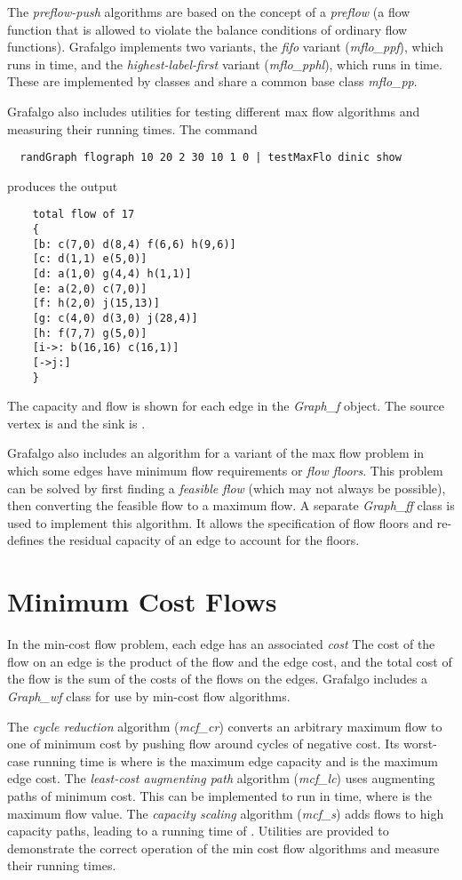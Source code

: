 \documentclass[11pt]{article}
\begin{document}
The {\sl preflow-push} algorithms are based on the concept of a {\sl preflow}
(a flow function that is allowed to violate the balance conditions of ordinary flow functions).
Grafalgo implements two variants, the {\sl fifo} variant ({\sl mflo\_ppf}), which runs in  time,
and the {\sl highest-label-first} variant ({\sl mflo\_pphl}), which runs in  time.
These are implemented by classes  and share
a common base class {\sl mflo\_pp}.

Grafalgo also includes utilities for testing different max flow algorithms and measuring their
running times. The command
\begin{verbatim}
  randGraph flograph 10 20 2 30 10 1 0 | testMaxFlo dinic show
\end{verbatim}
produces the output
\begin{verbatim}
    total flow of 17
    {
    [b: c(7,0) d(8,4) f(6,6) h(9,6)]
    [c: d(1,1) e(5,0)]
    [d: a(1,0) g(4,4) h(1,1)]
    [e: a(2,0) c(7,0)]
    [f: h(2,0) j(15,13)]
    [g: c(4,0) d(3,0) j(28,4)]
    [h: f(7,7) g(5,0)]
    [i->: b(16,16) c(16,1)]
    [->j:]
    }
\end{verbatim}
The capacity and flow is shown for each edge in the {\sl Graph\_f} object.
The source vertex is  and the sink is .

Grafalgo also includes an algorithm for a variant of the max flow problem in which
some edges have minimum flow requirements or {\sl flow floors}.
This problem can be solved by first finding a {\sl feasible flow} (which may not always be possible),
then converting the feasible flow to a maximum flow. A separate {\sl Graph\_ff} class is used to
implement this algorithm. It allows the specification of flow floors and re-defines the residual
capacity of an edge to account for the floors.

\section{Minimum Cost Flows}

In the min-cost flow problem, each edge has an associated {\sl cost}
The cost of the flow on an edge is the product of the flow and the edge cost,
and the total cost of the flow is the sum of the costs of the flows on the edges.
Grafalgo includes a {\sl Graph\_wf} class for use by min-cost flow algorithms.

The {\sl cycle reduction} algorithm ({\sl mcf\_cr}) converts an arbitrary maximum flow to one of minimum cost
by pushing flow around cycles of negative cost. Its worst-case running time is 
where  is the maximum edge capacity and  is the maximum edge cost.
The {\sl least-cost augmenting path} algorithm ({\sl mcf\_lc}) uses augmenting paths of minimum cost.
This can be implemented to run in  time, where  is the maximum flow value.
The {\sl capacity scaling} algorithm ({\sl mcf\_s}) adds flows to high capacity paths, leading to a running time
of .
Utilities are provided to demonstrate the correct operation of
the min cost flow algorithms and measure their running times.
\end{document}
